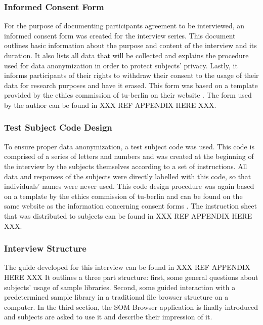 \subsubsection{Informed Consent Form}
\label{subsubsec:consent_form}
For the purpose of documenting participants agreement to be interviewed, an
informed consent form was created for the interview series. This document
outlines basic information about the purpose and content of the interview and
its duration. It also lists all data that will be collected and explains the
procedure used for data anonymization in order to protect subjects' privacy.
Lastly, it informs participants of their rights to withdraw their consent to the
usage of their data for research purposes and have it erased. This form was
based on a template provided by the ethics commission of \gls{tu-berlin} on
their website \citep{web:ethics2019}. The form used by the author can be found
in
XXX REF APPENDIX HERE XXX.

\subsubsection{Test Subject Code Design}
\label{subsubsec:subject_code}
To ensure proper data anonymization, a test subject code was used. This code
is comprised of a series of letters and numbers and was created at the beginning
of the interview by the subjects themselves according to a set of instructions.
All data and responses of the subjects were directly labelled with this code, so
that individuals' names were never used. This code design procedure was again
based on a template by the ethics commission of \gls{tu-berlin} and can be found
on the same website as the information concerning consent forms
\citep{web:ethics2019}. The instruction sheet that was distributed to subjects
can be found in
XXX REF APPENDIX HERE XXX.

\subsubsection{Interview Structure}
\label{subsubsec:interview_structure}
The guide developed for this interview can be found in
XXX REF APPENDIX HERE XXX
It outlines a three part structure: first, some general questions about
subjects' usage of sample libraries. Second, some guided interaction with a
predetermined sample library in a traditional file browser structure on a
computer. In the third section, the SOM Browser application is finally
introduced and subjects are asked to use it and describe their impression of it.

